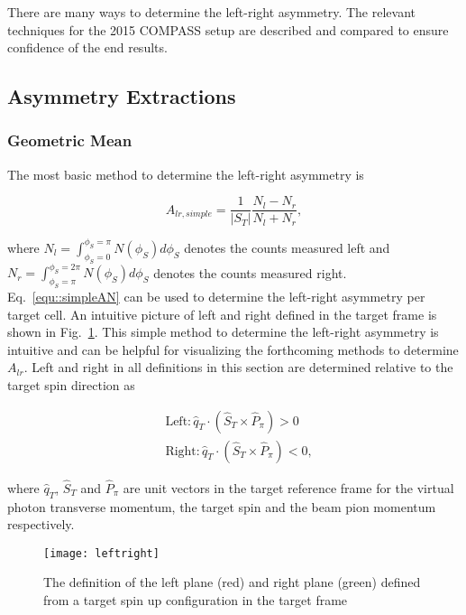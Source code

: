 There are many ways to determine the left-right asymmetry.  The relevant
techniques for the 2015 COMPASS setup are described and compared to ensure
confidence of the end results.  

\subsection{Asymmetry Extractions}
\subsubsection{Geometric Mean} \label{sec::GeoMean}
The most basic method to determine the left-right asymmetry is

\begin{equation}
  \label{equ::simpleAN}
  A_{lr,simple} = \frac{1}{|S_T|}
    \frac{N_l - N_r}{N_l + N_r},
\end{equation}

\noindent
where $N_l = \int_{\phi_S=0}^{\phi_S=\pi}N(\phi_S)d\phi_S$ denotes the counts
measured left and $N_r = \int_{\phi_S=\pi}^{\phi_S=2\pi}N(\phi_S)d\phi_S$
denotes the counts measured right.  Eq.~\ref{equ::simpleAN} can be used to
determine the left-right asymmetry per target cell.  An intuitive picture of
left and right defined in the target frame is shown in
Fig.~\ref{fig::leftright}.  This simple method to determine the left-right
asymmetry is intuitive and can be helpful for visualizing the forthcoming
methods to determine $A_{lr}$.  Left and right in all definitions in this
section are determined relative to the target spin direction as

\begin{equation}
  \label{equ::Defleftright}
  \begin{aligned}
    &\text{Left}: \hat{q}_T \cdot (\hat{S}_T \times \hat{P}_{\pi}) > 0 \\
    &\text{Right}: \hat{q}_T \cdot (\hat{S}_T \times \hat{P}_{\pi}) < 0, 
  \end{aligned}
\end{equation}

\noindent
where $\hat{q}_T$, $\hat{S}_T$ and $\hat{P}_{\pi}$ are unit vectors in the
target reference frame for the virtual photon transverse momentum, the target
spin and the beam pion momentum respectively.

\begin{figure}[h!t]
  \centering
  \texttt{[image: leftright]}
  \caption{The definition of the left plane (red) and right plane (green)
    defined from a target spin up configuration in the target frame}
  \label{fig::leftright}
\end{figure}

